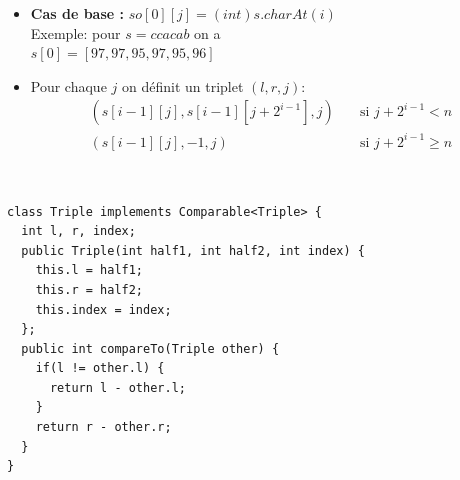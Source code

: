 \begin{itemize}

\item\textbf{Cas de base : }$so[0][j] = (int)s.charAt(i) $\\
Exemple: pour $s = ccacab$ on a \\$ s[0] = [97, 97, 95, 97, 95, 96]$
\item Pour chaque $j$ on définit un triplet $(l, r, j)$:
\begin{align*}
(s[i - 1][j], s[i - 1][j + 2^{i - 1}], j) & \quad \text{si $j + 2^{i - 1} < n$} \\
(s[i - 1][j], -1, j) & \quad \text{si $j + 2^{i - 1} \geq n$}
\end{align*}

\end{itemize}
\ \newline
\begin{lstlisting}
class Triple implements Comparable<Triple> {
  int l, r, index;
  public Triple(int half1, int half2, int index) {
    this.l = half1;
    this.r = half2;
    this.index = index;
  };
  public int compareTo(Triple other) {
    if(l != other.l) {
      return l - other.l;
    }
    return r - other.r;
  }
} 
\end{lstlisting}
\ \newline
